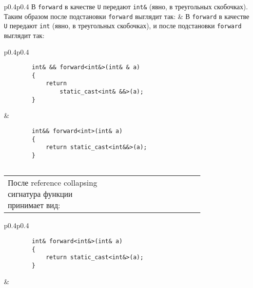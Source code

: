 \begin{center}
	\begin{tabular}{p{0.4\linewidth}p{0.4\linewidth}}
		В \texttt{forward} в качестве \texttt{U} передают \texttt{int&} (явно, в треугольных скобочках). Таким образом после подстановки \texttt{forward} выглядит так:
		& В \texttt{forward} в качестве \texttt{U} передают \texttt{int} (явно, в треугольных скобочках), и после подстановки \texttt{forward} выглядит так:
		\\
	\end{tabular}
	
	\begin{tabular}{p{0.4\linewidth}p{0.4\linewidth}}
		\begin{verbatim}
		int& && forward<int&>(int& & a)
		{
		    return 
		        static_cast<int& &&>(a);
		}
		\end{verbatim}
		& \begin{verbatim}
		int&& forward<int>(int& a)
		{
		    return static_cast<int&&>(a);
		}
		
		\end{verbatim}
	\end{tabular}
	
	\begin{tabular}{p{0.4\linewidth}p{0.4\linewidth}}
		После reference collapsing сигнатура функции принимает вид: & \vspace{\baselineskip}\\
	\end{tabular}
	
	\begin{tabular}{p{0.4\linewidth}p{0.4\linewidth}}
		\begin{verbatim}
		int& forward<int&>(int& a)
		{
		    return static_cast<int&>(a);
		}
		\end{verbatim}
		& \vspace{\baselineskip}\\
	\end{tabular}
	

\end{center}
